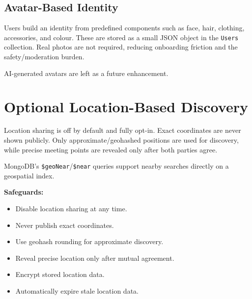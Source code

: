 \documentclass[11pt,a4paper]{article}
\begin{document}
\subsection{Avatar-Based Identity}

Users build an identity from predefined components such as face, hair, clothing, accessories, and colour. These are stored as a small JSON object in the \texttt{Users} collection. Real photos are not required, reducing onboarding friction and the safety/moderation burden.

AI-generated avatars are left as a future enhancement.

\section{Optional Location-Based Discovery}

Location sharing is off by default and fully opt-in. Exact coordinates are never shown publicly. Only approximate/geohashed positions are used for discovery, while precise meeting points are revealed only after both parties agree.

\begin{center}
\end{center}

MongoDB's \texttt{\$geoNear}/\texttt{\$near} queries support nearby searches directly on a geospatial index.

\textbf{Safeguards:}
\begin{itemize}
    \item Disable location sharing at any time.
    \item Never publish exact coordinates.
    \item Use geohash rounding for approximate discovery.
    \item Reveal precise location only after mutual agreement.
    \item Encrypt stored location data.
    \item Automatically expire stale location data.
\end{itemize}
\end{document}
